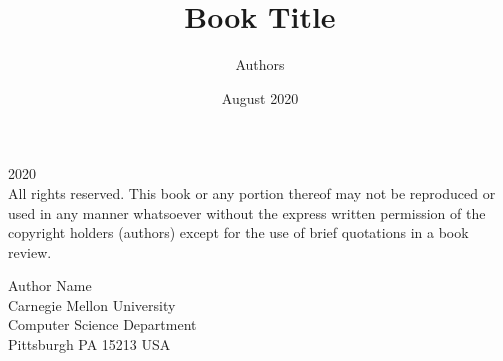 \title{Book Title}
\author{Authors}
\date{August 2020}
\hypersetup{pageanchor=false} 
\maketitle

\parindent 0pt
\parskip \baselineskip
\textcopyright{} 2020 
\\

All rights reserved.
This book or any portion thereof may not be reproduced or used in any
manner whatsoever without the express written permission of the
copyright holders (authors) except for the use of brief quotations in
a book review.

Author Name
\\
Carnegie Mellon University
\\
Computer Science Department
\\
Pittsburgh PA 15213 USA

\tableofcontents
\mainmatter
\hypersetup{pageanchor=true} 

